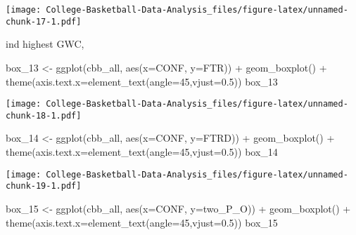 \documentclass[
]{article}
\newenvironment{Shaded}{\begin{snugshade}}{\end{snugshade}}
\newcommand{\AttributeTok}[1]{\textcolor[rgb]{0.77,0.63,0.00}{#1}}
\newcommand{\DecValTok}[1]{\textcolor[rgb]{0.00,0.00,0.81}{#1}}
\newcommand{\FloatTok}[1]{\textcolor[rgb]{0.00,0.00,0.81}{#1}}
\newcommand{\FunctionTok}[1]{\textcolor[rgb]{0.00,0.00,0.00}{#1}}
\newcommand{\NormalTok}[1]{#1}
\newcommand{\OtherTok}[1]{\textcolor[rgb]{0.56,0.35,0.01}{#1}}
\newcommand{\SpecialCharTok}[1]{\textcolor[rgb]{0.00,0.00,0.00}{#1}}
\begin{document}
\texttt{[image: College-Basketball-Data-Analysis\_files/figure-latex/unnamed-chunk-17-1.pdf]}

ind highest GWC,

\begin{Shaded}
\begin{Highlighting}[]
\NormalTok{box\_13 }\OtherTok{\textless{}{-}} \FunctionTok{ggplot}\NormalTok{(cbb\_all, }\FunctionTok{aes}\NormalTok{(}\AttributeTok{x=}\NormalTok{CONF, }\AttributeTok{y=}\NormalTok{FTR)) }\SpecialCharTok{+} \FunctionTok{geom\_boxplot}\NormalTok{() }\SpecialCharTok{+} \FunctionTok{theme}\NormalTok{(}\AttributeTok{axis.text.x=}\FunctionTok{element\_text}\NormalTok{(}\AttributeTok{angle=}\DecValTok{45}\NormalTok{,}\AttributeTok{vjust=}\FloatTok{0.5}\NormalTok{))}
\NormalTok{box\_13}
\end{Highlighting}
\end{Shaded}

\texttt{[image: College-Basketball-Data-Analysis\_files/figure-latex/unnamed-chunk-18-1.pdf]}

\begin{Shaded}
\begin{Highlighting}[]
\NormalTok{box\_14 }\OtherTok{\textless{}{-}} \FunctionTok{ggplot}\NormalTok{(cbb\_all, }\FunctionTok{aes}\NormalTok{(}\AttributeTok{x=}\NormalTok{CONF, }\AttributeTok{y=}\NormalTok{FTRD)) }\SpecialCharTok{+} \FunctionTok{geom\_boxplot}\NormalTok{() }\SpecialCharTok{+} \FunctionTok{theme}\NormalTok{(}\AttributeTok{axis.text.x=}\FunctionTok{element\_text}\NormalTok{(}\AttributeTok{angle=}\DecValTok{45}\NormalTok{,}\AttributeTok{vjust=}\FloatTok{0.5}\NormalTok{))}
\NormalTok{box\_14}
\end{Highlighting}
\end{Shaded}

\texttt{[image: College-Basketball-Data-Analysis\_files/figure-latex/unnamed-chunk-19-1.pdf]}

\begin{Shaded}
\begin{Highlighting}[]
\NormalTok{box\_15 }\OtherTok{\textless{}{-}} \FunctionTok{ggplot}\NormalTok{(cbb\_all, }\FunctionTok{aes}\NormalTok{(}\AttributeTok{x=}\NormalTok{CONF, }\AttributeTok{y=}\NormalTok{two\_P\_O)) }\SpecialCharTok{+} \FunctionTok{geom\_boxplot}\NormalTok{() }\SpecialCharTok{+} \FunctionTok{theme}\NormalTok{(}\AttributeTok{axis.text.x=}\FunctionTok{element\_text}\NormalTok{(}\AttributeTok{angle=}\DecValTok{45}\NormalTok{,}\AttributeTok{vjust=}\FloatTok{0.5}\NormalTok{))}
\NormalTok{box\_15}
\end{Highlighting}
\end{Shaded}
\end{document}
